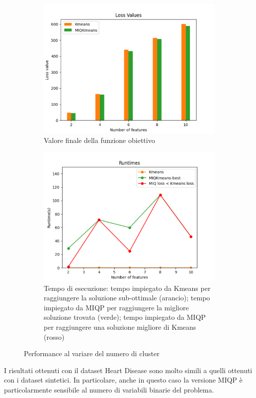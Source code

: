\documentclass{article}
\begin{document}
    \begin{figure}[H]
     \centering
     \begin{subfigure}[t]{0.49\linewidth}
         \centering
         \includegraphics[width=\linewidth]{../results/plots/loss_features_heart}
         \caption{Valore finale della funzione obiettivo}
     \end{subfigure}
     \hfill
     \begin{subfigure}[t]{0.49\linewidth}
         \centering
         \includegraphics[width=\linewidth]{../results/plots/runtime_features_heart}
         \caption{Tempo di esecuzione: tempo impiegato da Kmeans per raggiungere la soluzione sub-ottimale (arancio); tempo impiegato da MIQP per raggiungere la migliore soluzione trovata (verde); tempo impiegato da MIQP per raggiungere una soluzione migliore di Kmeans (rosso)}
     \end{subfigure}
        \caption{Performance al variare del numero di cluster}
        \label{fig:f_real}
     \end{figure}
    I risultati ottenuti con il dataset Heart Disease sono molto simili a quelli ottenuti con i dataset sintetici. In particolare, anche in questo caso la versione MIQP è particolarmente sensibile al numero di variabili binarie del problema.\\
\end{document}

